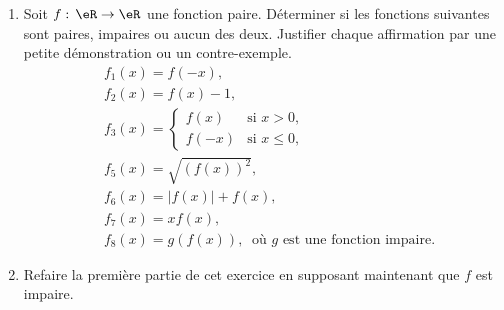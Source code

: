 
\begin{exercice}\label{exoanalyseCTU-0103}

  \begin{enumerate}
  \item Soit $f:\,\eR\to\eR$ une fonction paire. Déterminer si les fonctions suivantes sont paires, impaires ou aucun des deux. Justifier chaque affirmation par une petite démonstration ou un contre-exemple.
      \begin{subequations}
        \begin{align}
          &f_1 (x) = f(-x),\\
          &f_2 (x) = f(x)-1,\\
          &f_3 (x)= 
          \begin{cases}
            f(x) &\text{si } x>0, \\
            f(-x)& \text{si } x\leq 0,
          \end{cases}\\
         &f_5(x) = \sqrt{(f(x))^2},\\
          &f_6(x)= |f(x)| + f(x),\\
          &f_7(x) = xf(x), \\
          &f_8(x) = g(f(x)), \:\text{ où } g \text{ est une fonction impaire}.
        \end{align}
      \end{subequations}
\item Refaire la première partie de cet exercice en supposant maintenant que $f$ est impaire.
  \end{enumerate} 

\end{exercice}
